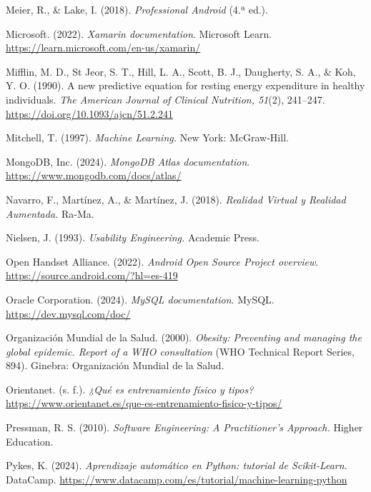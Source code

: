 \begin{referenciasapa}
\item Meier, R., \& Lake, I. (2018). \textit{Professional Android} (4.ª ed.).

\item Microsoft. (2022). \textit{Xamarin documentation}. Microsoft Learn. \url{https://learn.microsoft.com/en-us/xamarin/}

\item Mifflin, M. D., St Jeor, S. T., Hill, L. A., Scott, B. J., Daugherty, S. A., \& Koh, Y. O. (1990). A new predictive equation for resting energy expenditure in healthy individuals. \textit{The American Journal of Clinical Nutrition, 51}(2), 241--247. \url{https://doi.org/10.1093/ajcn/51.2.241}

\item Mitchell, T. (1997). \textit{Machine Learning.} New York: McGraw-Hill.

\item MongoDB, Inc. (2024). \textit{MongoDB Atlas documentation}. \url{https://www.mongodb.com/docs/atlas/}

\item Navarro, F., Martínez, A., \& Martínez, J. (2018). \textit{Realidad Virtual y Realidad Aumentada.} Ra-Ma.

\item Nielsen, J. (1993). \textit{Usability Engineering.} Academic Press.

\item Open Handset Alliance. (2022). \textit{Android Open Source Project overview}. \url{https://source.android.com/?hl=es-419}

\item Oracle Corporation. (2024). \textit{MySQL documentation}. MySQL. \url{https://dev.mysql.com/doc/}

\item Organización Mundial de la Salud. (2000). \textit{Obesity: Preventing and managing the global epidemic. Report of a WHO consultation} (WHO Technical Report Series, 894). Ginebra: Organización Mundial de la Salud.

\item Orientanet. (s. f.). \textit{¿Qué es entrenamiento físico y tipos?} \url{https://www.orientanet.es/que-es-entrenamiento-fisico-y-tipos/}

\item Pressman, R. S. (2010). \textit{Software Engineering: A Practitioner's Approach.} Higher Education.

\item Pykes, K. (2024). \textit{Aprendizaje automático en Python: tutorial de Scikit-Learn}. DataCamp. \url{https://www.datacamp.com/es/tutorial/machine-learning-python}


\end{referenciasapa}
